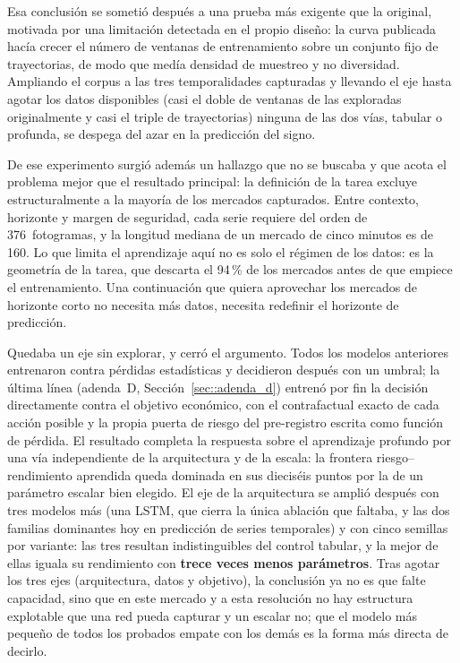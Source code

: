 Esa conclusión se sometió después a una prueba más exigente que la original, motivada por
una limitación detectada en el propio diseño: la curva publicada hacía crecer el número de
ventanas de entrenamiento sobre un conjunto fijo de trayectorias, de modo que medía densidad
de muestreo y no diversidad. Ampliando el corpus a las tres temporalidades capturadas y
llevando el eje hasta agotar los datos disponibles (casi el doble de ventanas de las
exploradas originalmente y casi el triple de trayectorias) ninguna de las dos vías, tabular
o profunda, se despega del azar en la predicción del signo.

De ese experimento surgió además un hallazgo que no se buscaba y que acota el problema mejor
que el resultado principal: la definición de la tarea excluye estructuralmente a la mayoría
de los mercados capturados. Entre contexto, horizonte y margen de seguridad, cada serie
requiere del orden de 376~fotogramas, y la longitud mediana de un mercado de cinco minutos
es de 160. Lo que limita el aprendizaje aquí no es solo el régimen de los datos: es la
geometría de la tarea, que descarta el 94\,\% de los mercados antes de que empiece el
entrenamiento. Una continuación que quiera aprovechar los mercados de horizonte corto no
necesita más datos, necesita redefinir el horizonte de predicción.

Quedaba un eje sin explorar, y cerró el argumento. Todos los modelos anteriores entrenaron
contra pérdidas estadísticas y decidieron después con un umbral; la última línea
(adenda~D, Sección~\ref{sec::adenda_d}) entrenó por fin la decisión directamente contra el
objetivo económico, con el contrafactual exacto de cada acción posible y la propia puerta
de riesgo del pre-registro escrita como función de pérdida. El resultado completa la
respuesta sobre el aprendizaje profundo por una vía independiente de la arquitectura y de
la escala: la frontera riesgo--rendimiento aprendida queda dominada en sus dieciséis puntos
por la de un parámetro escalar bien elegido. El eje de la arquitectura se amplió después con
tres modelos más (una LSTM, que cierra la única ablación que faltaba, y las dos familias
dominantes hoy en predicción de series temporales) y con cinco semillas por variante: las tres
resultan indistinguibles del control tabular, y la mejor de ellas iguala su rendimiento con
\textbf{trece veces menos parámetros}. Tras agotar los tres ejes (arquitectura, datos y
objetivo), la conclusión ya no es que falte capacidad, sino que en este mercado y a esta
resolución no hay estructura explotable que una red pueda capturar y un escalar no; que el
modelo más pequeño de todos los probados empate con los demás es la forma más directa de
decirlo.

